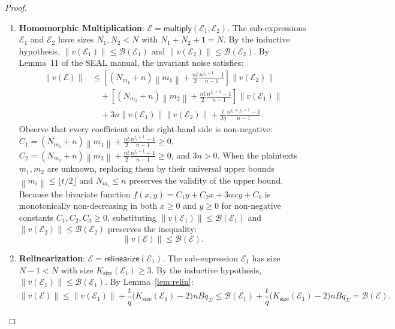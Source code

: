 \documentclass[11pt]{article}
\theoremstyle{definition}
\theoremstyle{remark}
\newcommand{\norm}[1]{\left\lVert #1\right\rVert}
\newcommand{\Sgeo}[1]{\frac{n^{#1+1}-1}{n-1}}
\begin{document}
\begin{proof}
\begin{enumerate}[leftmargin=2em]
\item \textbf{Homomorphic Multiplication}: $\mathcal{E} = \mathsf{multiply}(\mathcal{E}_1, \mathcal{E}_2)$.
      The sub-expressions $\mathcal{E}_1$ and $\mathcal{E}_2$ have sizes $N_1, N_2 < N$ with $N_1 + N_2 + 1 = N$.
      By the inductive hypothesis, $\norm{v(\mathcal{E}_1)} \leq \mathcal{B}(\mathcal{E}_1)$ and $\norm{v(\mathcal{E}_2)} \leq \mathcal{B}(\mathcal{E}_2)$.
      By Lemma~11 of the SEAL manual, the invariant noise satisfies:
      \begin{align*}
        \norm{v(\mathcal{E})}
        &\leq \left[(N_{m_1}+n)\norm{m_1} + \frac{nt}{2}\Sgeo{j_1}\right]\norm{v(\mathcal{E}_2)}\\
        &\quad+ \left[(N_{m_2}+n)\norm{m_2} + \frac{nt}{2}\Sgeo{j_2}\right]\norm{v(\mathcal{E}_1)}\\
        &\quad+ 3n\norm{v(\mathcal{E}_1)}\norm{v(\mathcal{E}_2)} + \frac{t}{2q}\Sgeo{j_1+j_2}.
      \end{align*}
      Observe that every coefficient on the right-hand side is non-negative:
      $C_1 = (N_{m_1}+n)\norm{m_1} + \frac{nt}{2}\Sgeo{j_1} \geq 0$,
      $C_2 = (N_{m_2}+n)\norm{m_2} + \frac{nt}{2}\Sgeo{j_2} \geq 0$, and $3n > 0$.
      When the plaintexts $m_1, m_2$ are unknown, replacing them by their universal upper bounds $\norm{m_i} \leq \lfloor t/2 \rfloor$ and $N_{m_i} \leq n$ preserves the validity of the upper bound.
      Because the bivariate function $f(x, y) = C_1 y + C_2 x + 3nxy + C_0$ is monotonically non-decreasing in both $x \geq 0$ and $y \geq 0$ for non-negative constants $C_1, C_2, C_0 \geq 0$, substituting $\norm{v(\mathcal{E}_1)} \leq \mathcal{B}(\mathcal{E}_1)$ and $\norm{v(\mathcal{E}_2)} \leq \mathcal{B}(\mathcal{E}_2)$ preserves the inequality:
      \[
        \norm{v(\mathcal{E})} \leq \mathcal{B}(\mathcal{E}).
      \]

\item \textbf{Relinearization}: $\mathcal{E} = \mathsf{relinearize}(\mathcal{E}_1)$.
      The sub-expression $\mathcal{E}_1$ has size $N-1 < N$ with size $K_{\mathrm{size}}(\mathcal{E}_1) \geq 3$.
      By the inductive hypothesis, $\norm{v(\mathcal{E}_1)} \leq \mathcal{B}(\mathcal{E}_1)$.
      By Lemma~\ref{lem:relin}:
      \[
        \norm{v(\mathcal{E})} \leq \norm{v(\mathcal{E}_1)} + \frac{t}{q}\bigl(K_{\mathrm{size}}(\mathcal{E}_1)-2\bigr)nBq_\Sigma
        \leq \mathcal{B}(\mathcal{E}_1) + \frac{t}{q}\bigl(K_{\mathrm{size}}(\mathcal{E}_1)-2\bigr)nBq_\Sigma = \mathcal{B}(\mathcal{E}).
      \]


\end{enumerate}
\end{proof}
\end{document}
